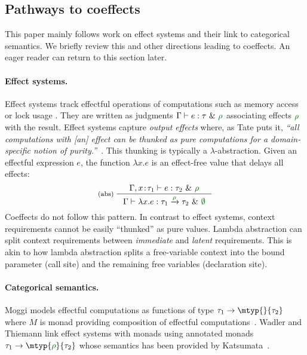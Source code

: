 
\subsection{Pathways to coeffects}
\label{sec:intro-pathways}

This paper mainly follows work on effect systems and their link to categorical semantics. We briefly 
review this and other directions leading to coeffects. An eager reader can return to this section later.

\paragraph{Effect systems.}

Effect systems \cite{gifford1986effects} track
effectful operations of computations such as memory access or lock
usage \cite{flanagan2003type}. They are written as judgments $\Gamma
\vdash e : \tau ~\&~\cclrd{\rho}$ associating effects
$\cclrd{\rho}$ with the result. Effect systems capture \emph{output
  effects} where, as Tate puts it, \emph{``all computations with [an]
  effect can be thunked as pure computations for a domain-specific
  notion of purity.''}~\cite{effects-producer-semantics}.  This
thunking is typically a $\lambda$-abstraction. Given an effectful
expression $e$, the function $\lambda x . e$ is an effect-free value
that delays all effects:
%
\begin{equation*}
\inference[({abs})\;]
  {\Gamma, x\!:\!\tau_1 \vdash e : \tau_2 ~\&~\cclrd{\rho}} 
  {\Gamma \vdash \lambda x.e : \tau_1 \xrightarrow{\cclrd{\rho}} \tau_2~\&~\cclrd{\emptyset}}
\end{equation*}
%
Coeffects do not follow this pattern.  In contrast to effect systems,
context requirements cannot be easily ``thunked'' as
pure values. Lambda abstraction can split context requirements
between \emph{immediate} and \emph{latent} requirements. This is akin
to how lambda abstraction splits a free-variable context into 
the bound parameter (call site) and the remaining free variables (declaration site).

\paragraph{Categorical semantics.}
Moggi models effectful computations as functions of type 
$\tau_1 \rightarrow \mtyp{}{\tau_2}$ where $M$ is monad providing composition of effectful 
computations~\cite{moggi1991monads}. Wadler and Thiemann \cite{wadler2003marriage} link effect systems with monads using 
annotated monads $\tau_1 \rightarrow \mtyp{\cclrd{\rho}}{\tau_2}$ whose semantics has been 
provided by Katsumata~\cite{katsumata2014parametric}.

